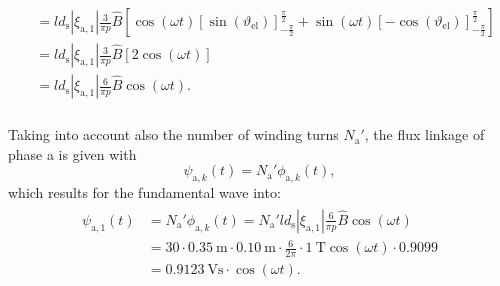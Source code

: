 \begin{solutionblock}
\begin{align}
\begin{split}
                                   & = l d_{\mathrm{s}} |\xi_{\mathrm{a},1}|
            \frac{3}{\pi p} \hat{B}
            \left[\cos(\omega t) \left[\sin(\vartheta_{\mathrm{el}}) \right]_{-\frac{\pi}{2}}^{\frac{\pi}{2}} + \sin(\omega t) \left[-\cos(\vartheta_{\mathrm{el}}) \right]_{-\frac{\pi}{2}}^{\frac{\pi}{2}} \right]                                                   \\
                                   & = l d_{\mathrm{s}} |\xi_{\mathrm{a},1}|
            \frac{3}{\pi p} \hat{B} \left[ 2 \cos(\omega t)\right]                                                                                                                                                                                                     \\
                                   & = l d_{\mathrm{s}} |\xi_{\mathrm{a},1}|
            \frac{6}{\pi p} \hat{B} \cos(\omega t).                                                                                                                                                                                                                    \\
        \end{split}
    \end{align}

    Taking into account also the number of winding turns $N_{\mathrm{a}}'$, the flux linkage of phase a is given with
    \begin{equation}
        \psi_{\mathrm{a,}k}(t) = N_{\mathrm{a}}' \phi_{\mathrm{a,}k}(t),
        \label{eq:psi_a_k}
    \end{equation}
    which results for the fundamental wave into:
    \begin{align}
        \begin{split}
            \psi_{\mathrm{a,}1}(t) & = N_{\mathrm{a}}' \phi_{\mathrm{a,}k}(t)
            = N_{\mathrm{a}}' l d_{\mathrm{s}} |\xi_{\mathrm{a},1}| \frac{6}{\pi p} \hat{B} \cos(\omega t)                                                      \\
                                   & = 30 \cdot \SI{0.35}{\metre} \cdot \SI{0.10}{\metre} \cdot \frac{6}{2\pi} \cdot \SI{1}{\tesla} \cos(\omega t) \cdot 0.9099 \\
                                   & = \SI{0.9123}{\volt\second} \cdot \cos(\omega t).
        \end{split}
    \end{align}


\end{solutionblock}
